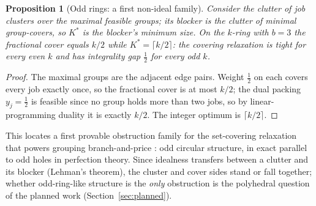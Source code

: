 \documentclass[11pt,a4paper]{article}
\theoremstyle{plain}
\newtheorem{proposition}{Proposition}
\theoremstyle{definition}
\theoremstyle{remark}
\newcommand{\Kst}{K^{\ast}}
\begin{document}
\begin{proposition}[Odd rings: a first non-ideal family]\label{prop:oddring}
Consider the clutter of job clusters over the maximal feasible groups; its
blocker is the clutter of minimal group-covers, so $\Kst$ is the blocker's
minimum size. On the $k$-ring with $b=3$ the fractional cover equals $k/2$
while $\Kst=\lceil k/2\rceil$: the covering relaxation is tight for every even
$k$ and has integrality gap $\tfrac12$ for every odd $k$.
\end{proposition}
\begin{proof}
The maximal groups are the adjacent edge pairs. Weight $\tfrac12$ on each
covers every job exactly once, so the fractional cover is at most $k/2$; the
dual packing $y_j=\tfrac12$ is feasible since no group holds more than two
jobs, so by linear-programming duality it is exactly $k/2$. The integer
optimum is $\lceil k/2\rceil$.
\end{proof}
\noindent This locates a first provable obstruction family for the
set-covering relaxation that powers grouping branch-and-price
\citep{Crama1994Column,Otiai2026}: odd circular structure, in exact parallel to
odd holes in perfection theory. Since idealness transfers between a clutter and
its blocker (Lehman's theorem), the cluster and cover sides stand or fall
together; whether odd-ring-like structure is the \emph{only} obstruction is the
polyhedral question of the planned work (Section~\ref{sec:planned}).
\end{document}
